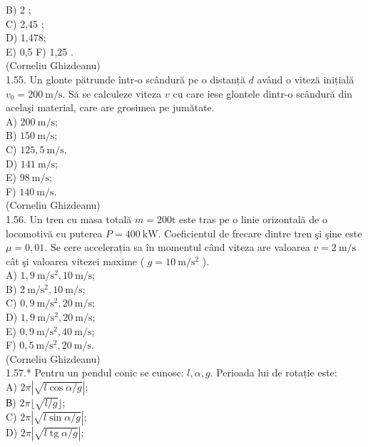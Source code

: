 \documentclass[10pt]{article}
\begin{document}
B) 2 ;\\
C) 2,45 ;\\
D) 1,478;\\
E) 0,5 F) 1,25 .\\
(Corneliu Ghizdeanu)\\
1.55. Un glonte pătrunde într-o scândură pe o distanță $d$ având o viteză inițială $v_{0}=200 \mathrm{~m} / \mathrm{s}$. Să se calculeze viteza $v$ cu care iese glontele dintr-o scândură din acelaşi material, care are grosimea pe jumătate.\\
A) $200 \mathrm{~m} / \mathrm{s}$;\\
B) $150 \mathrm{~m} / \mathrm{s}$;\\
C) $125,5 \mathrm{~m} / \mathrm{s}$,\\
D) $141 \mathrm{~m} / \mathrm{s}$;\\
E) $98 \mathrm{~m} / \mathrm{s}$;\\
F) $140 \mathrm{~m} / \mathrm{s}$.\\
(Corneliu Ghizdeanu)\\
1.56. Un tren cu masa totală $m=200 \mathrm{t}$ este tras pe o linie orizontală de o locomotivă cu puterea $P=400 \mathrm{~kW}$. Coeficientul de frecare dintre tren şi şine este $\mu=0,01$. Se cere accelerația sa în momentul când viteza are valoarea $v=2 \mathrm{~m} / \mathrm{s}$ cât şi valoarea vitezei maxime ( $g=10 \mathrm{~m} / \mathrm{s}^{2}$ ).\\
A) $1,9 \mathrm{~m} / \mathrm{s}^{2}, 10 \mathrm{~m} / \mathrm{s}$;\\
B) $2 \mathrm{~m} / \mathrm{s}^{2}, 10 \mathrm{~m} / \mathrm{s}$;\\
C) $0,9 \mathrm{~m} / \mathrm{s}^{2}, 20 \mathrm{~m} / \mathrm{s}$;\\
D) $1,9 \mathrm{~m} / \mathrm{s}^{2}, 20 \mathrm{~m} / \mathrm{s}$;\\
E) $0,9 \mathrm{~m} / \mathrm{s}^{2}, 40 \mathrm{~m} / \mathrm{s}$;\\
F) $0,5 \mathrm{~m} / \mathrm{s}^{2}, 20 \mathrm{~m} / \mathrm{s}$.\\
(Corneliu Ghizdeanu)\\
1.57.* Pentru un pendul conic se cunosc: $l, \alpha, g$. Perioada lui de rotație este:\\
A) $2 \pi|\sqrt{l \cos \alpha / g}|$;\\
В) $2 \pi\lfloor\sqrt{l / g}\rfloor$;\\
C) $2 \pi|\sqrt{l \sin \alpha / g}|$;\\
D) $2 \pi|\sqrt{l \operatorname{tg} \alpha / g}|$;\\
\end{document}
